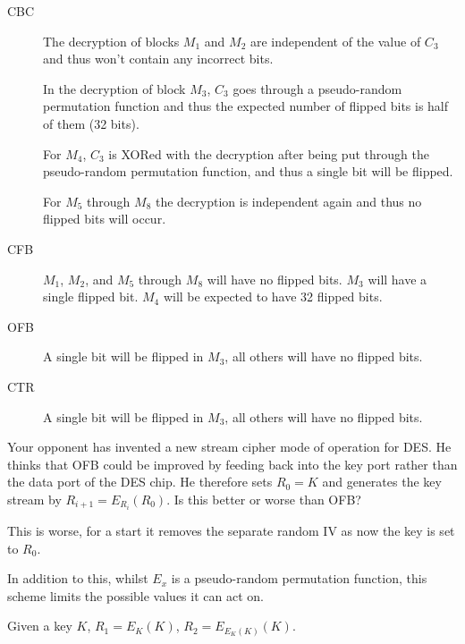 \documentclass{supervision}
\begin{document}
\begin{questions}
\begin{solution}
\begin{description}
          \item[CBC] The decryption of blocks $M_1$ and $M_2$ are independent
            of the value of $C_3$ and thus won't contain any incorrect bits.

            In the decryption of block $M_3$, $C_3$ goes through a pseudo-random
            permutation function and thus the expected number of flipped bits
            is half of them (32 bits).

            For $M_4$, $C_3$ is XORed with the decryption after being put
            through the pseudo-random permutation function, and thus a single
            bit will be flipped.

            For $M_5$ through $M_8$ the decryption is independent again and thus
            no flipped bits will occur.

          \item[CFB] $M_1$, $M_2$, and $M_5$ through $M_8$ will have no flipped
            bits. $M_3$ will have a single flipped bit. $M_4$ will be expected
            to have 32 flipped bits.

          \item[OFB] A single bit will be flipped in $M_3$, all others will have
            no flipped bits.

          \item[CTR] A single bit will be flipped in $M_3$, all others will have
            no flipped bits.
        \end{description}
      \end{solution}

    \question Your opponent has invented a new stream cipher mode of operation
      for DES. He thinks that OFB could be improved by feeding back into the
      key port rather than the data port of the DES chip. He therefore sets
      $R_0 = K$ and generates the key stream by $R_{i+1} = E_{R_i}(R_0)$. Is
      this better or worse than OFB?

      \begin{solution}
        This is worse, for a start it removes the separate random IV as now
        the key is set to $R_0$.

        In addition to this, whilst $E_x$ is a pseudo-random permutation
        function, this scheme limits the possible values it can act on.

        Given a key $K$, $R_1 = E_K(K)$, $R_2 = E_{E_K(K)}(K)$.
      \end{solution}


\end{questions}
\end{document}
